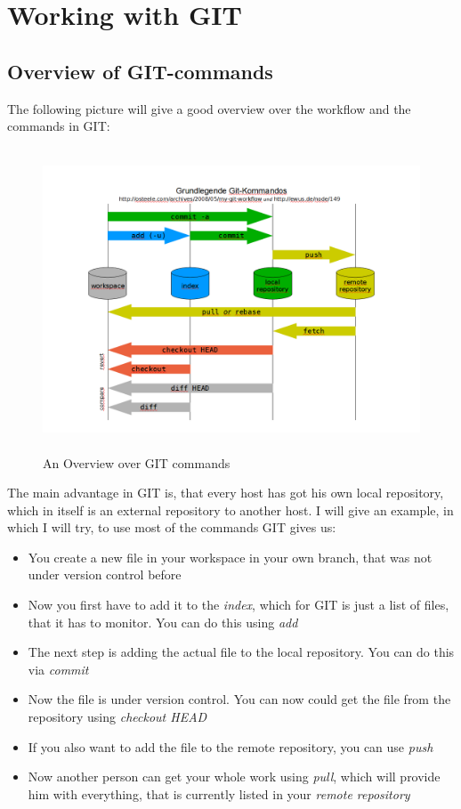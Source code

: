 \section{Working with GIT}

\subsection{Overview of GIT-commands}

The following picture will give a good overview over the workflow and the commands in GIT:\\
\begin{figure}[h!]
 \begin{center}
  \includegraphics[width=12cm,height=9cm]{./pics/git.png}
 \end{center}
 \caption{An Overview over GIT commands}
\end{figure}
The main advantage in GIT is, that every host has got his own local repository, which in itself is an external repository to another host.\newpage 
I will give an example, in which I will try, to use most of the commands GIT gives us:
\begin{itemize}
 \item You create a new file in your workspace in your own branch, that was not under version control before
 \item Now you first have to add it to the \emph{index}, which for GIT is just a list of files, that it has to monitor. You can do this using \emph{add}
 \item The next step is adding the actual file to the local repository. You can do this via \emph{commit}
 \item Now the file is under version control. You can now could get the file from the repository using \emph{checkout HEAD}
 \item If you also want to add the file to the remote repository, you can use \emph{push}
 \item Now another person can get your whole work using \emph{pull}, which will provide him with everything, that is currently listed in your \emph{remote repository}
\end{itemize}
